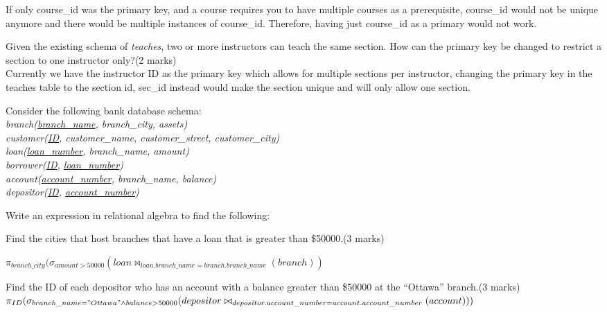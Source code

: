 \documentclass[a4 paper]{article}
\begin{document}
If only course\_id was the primary key, and a course requires you to have multiple courses as a prerequisite,
course\_id would not be unique anymore and there would be multiple instances of course\_id. Therefore, having just course\_id as a primary would not work.

 Given the existing schema of \emph{teaches}, two or more instructors can teach the same section. How can the primary key be changed to restrict a section to one instructor only?\indent (2 marks)\\

Currently we have the instructor ID as the primary key which allows for multiple sections per instructor, 
changing the primary key in the teaches table to the section id, sec\_id instead would make the section unique and will only allow one section. 

Consider the following bank database schema:\\
\emph{branch(\underline{branch\_name}, branch\_city, assets)}\\
\emph{customer(\underline{ID}, customer\_name, customer\_street, customer\_city)}\\
\emph{loan(\underline{loan\_number}, branch\_name, amount)}\\
\emph{borrower(\underline{ID}, \underline{loan\_number})}\\
\emph{account(\underline{account\_number}, branch\_name, balance)}\\
\emph{depositor(\underline{ID}, \underline{account\_number})}

\noindent Write an expression in relational algebra to find the following:

 Find the cities that host branches that have a loan that is greater than \$50000.\indent (3 marks)\\
\begin{comment}
$\pi$branch\_city($\sigma$amount$>$50000(loan$\bowtie$loan.branch\_name=branch.branch\_name(branch))
\end{comment}

$\pi_{branch\_city}(\sigma_{amount>50000}(loan\bowtie _{loan.branch\_name=branch.branch\_name}(branch))$

 Find the ID of each depositor who has an account with a balance greater than \$50000 at the ``Ottawa'' branch.\indent (3 marks)\\

$\pi_{ID}(\sigma _{branch\_name="Ottawa"\land balance>50000}(depositor\bowtie _{depositor.account\_number=account.account\_number}(account)))$
\end{document}
